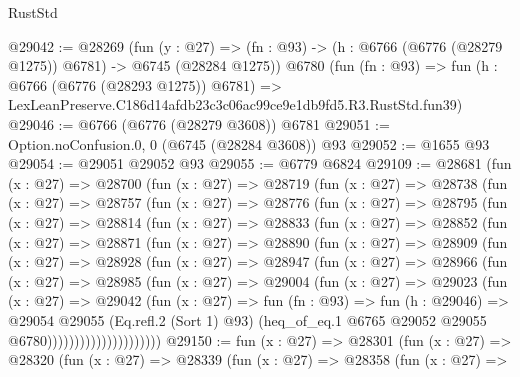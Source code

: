 \begin{lexlean}{RustStd}
\begin{coremodule}
@29042 := @28269
    (fun (y : @27) =>
    (fn : @93) -> (h : @6766 (@6776 (@28279 @1275)) @6781) -> @6745 (@28284 @1275))
    @6780
    (fun (fn : @93) =>
    fun (h : @6766 (@6776 (@28293 @1275)) @6781) =>
    LexLeanPreserve.C186d14afdb23c3c06ac99ce9e1db9fd5.R3.RustStd.fun39)
@29046 := @6766 (@6776 (@28279 @3608)) @6781
@29051 := Option.noConfusion.{0, 0} (@6745 (@28284 @3608)) @93
@29052 := @1655 @93
@29054 := @29051 @29052 @93
@29055 := @6779 @6824
@29109 := @28681
    (fun (x : @27) =>
    @28700
      (fun (x : @27) =>
      @28719
        (fun (x : @27) =>
        @28738
          (fun (x : @27) =>
          @28757
            (fun (x : @27) =>
            @28776
              (fun (x : @27) =>
              @28795
                (fun (x : @27) =>
                @28814
                  (fun (x : @27) =>
                  @28833
                    (fun (x : @27) =>
                    @28852
                      (fun (x : @27) =>
                      @28871
                        (fun (x : @27) =>
                        @28890
                          (fun (x : @27) =>
                          @28909
                            (fun (x : @27) =>
                            @28928
                              (fun (x : @27) =>
                              @28947
                                (fun (x : @27) =>
                                @28966
                                  (fun (x : @27) =>
                                  @28985
                                    (fun (x : @27) =>
                                    @29004
                                      (fun (x : @27) =>
                                      @29023
                                        (fun (x : @27) =>
                                        @29042
                                          (fun (x : @27) =>
                                          fun (fn : @93) =>
                                          fun (h : @29046) =>
                                          @29054
                                            @29055
                                            (Eq.refl.{2} (Sort 1) @93)
                                            (heq_of_eq.{1}
                                              @6765
                                              @29052
                                              @29055
                                              @6780)))))))))))))))))))))
@29150 := fun (x : @27) =>
  @28301
    (fun (x : @27) =>
    @28320
      (fun (x : @27) =>
      @28339
        (fun (x : @27) =>
        @28358
          (fun (x : @27) =>

\end{coremodule}
\end{lexlean}
